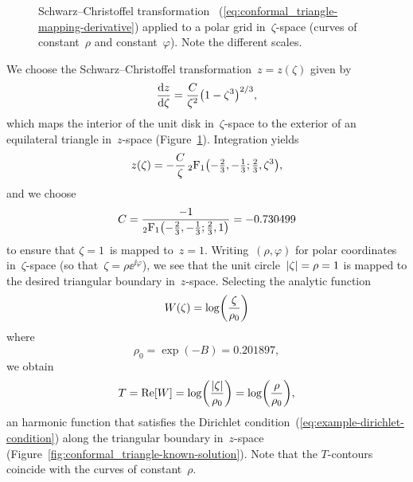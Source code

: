 \begin{figure}
  \newcommand*{\subfigurewidth}{0.47\textwidth}
  \begin{subfigure}[t]{\subfigurewidth}
  \end{subfigure}
    \hfill
  \begin{subfigure}[t]{\subfigurewidth}
  \end{subfigure}
  \caption{
    Schwarz--Christoffel transformation~%
      (\ref{eq:conformal_triangle-mapping-derivative})
    applied to a polar grid in~$\zeta$-space
    (curves of constant~$\rho$ and constant~$\varphi$).
    Note the different scales.
  }
  \label{fig:conformal_triangle-grid}
\end{figure}

We choose the Schwarz--Christoffel transformation~$z = z (\zeta)$
given by
\begin{equation}
  \tder{z}{\zeta} = \frac{C}{\zeta^2} \roundbr*{1 - \zeta^3}^{2/3},
  \label{eq:conformal_triangle-mapping-derivative}
\end{equation}
which maps the interior of the unit disk in~$\zeta$-space
to the exterior of an equilateral triangle in~$z$-space
(Figure~\ref{fig:conformal_triangle-grid}).
Integration yields
\begin{equation}
  z (\zeta) =
    -\frac{C}{\zeta}
    \hypergeo \roundbr*{-\tfrac{2}{3}, -\tfrac{1}{3}; \tfrac{2}{3}, \zeta^3},
  \label{eq:conformal_triangle-mapping}
\end{equation}
and we choose
\begin{equation}
  C =
    \frac{
      -1
    }{
      \hypergeo \roundbr*{-\tfrac{2}{3}, -\tfrac{1}{3}; \tfrac{2}{3}, 1}
    }
    = -0.730499
  \label{eq:conformal_triangle-mapping-constant}
\end{equation}
to ensure that $\zeta = 1$~is mapped to~$z = 1$.
Writing~$(\rho, \varphi)$ for polar coordinates in~$\zeta$-space
(so that~$\zeta = \rho \ee^{\ii \varphi}$),
we see that the unit circle~$\lvert\zeta\rvert = \rho = 1$
is mapped to the desired triangular boundary in~$z$-space.
Selecting the analytic function
\begin{equation}
  W (\zeta) = \log \roundbr*{\frac{\zeta}{\rho_0}}
  \label{eq:conformal_triangle-analytic-function}
\end{equation}
where
\begin{equation}
  \rho_0 = \exp (-B) = 0.201897,
  \label{eq:conformal_triangle-minimum-zeta-radius}
\end{equation}
we obtain
\begin{equation}
  T = \re [W]
    = \log \roundbr*{\frac{\abs{\zeta}}{\rho_0}}
    = \log \roundbr*{\frac{\rho}{\rho_0}},
  \label{eq:conformal_triangle-known-solution}
\end{equation}
an harmonic function that satisfies
the Dirichlet condition~(\ref{eq:example-dirichlet-condition})
along the triangular boundary in~$z$-space
(Figure~\ref{fig:conformal_triangle-known-solution}).
Note that the $T$-contours coincide
with the curves of constant~$\rho$.


